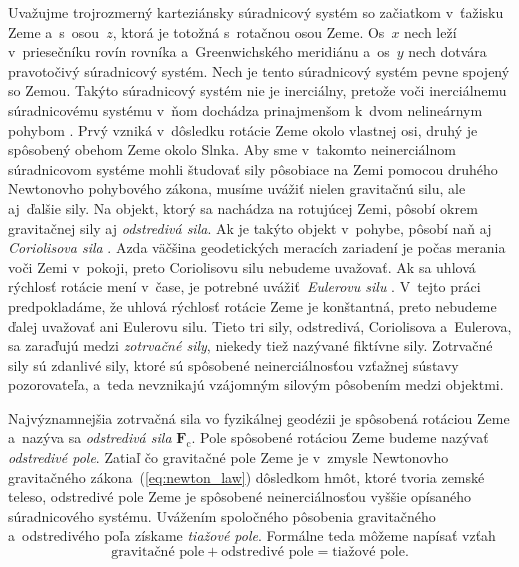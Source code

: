 \documentclass[a4paper, 12pt]{book}
\newcommand{\cidx}{\mathrm c}
\let\vec\mathbf
\begin{document}
Uvažujme trojrozmerný karteziánsky súradnicový systém so začiatkom v~ťažisku 
Zeme a~s~osou~$z$, ktorá je totožná s~rotačnou osou Zeme.  Os~$x$ nech leží 
v~priesečníku rovín rovníka a~Greenwichského meridiánu a~os~$y$ nech dotvára 
pravotočivý súradnicový systém.  Nech je tento súradnicový systém pevne spojený 
so Zemou.  Takýto súradnicový systém nie je inerciálny, pretože voči 
inerciálnemu súradnicovému systému v~ňom dochádza prinajmenšom k~dvom 
nelineárnym pohybom \parencite{SansoGeoidDetermination}.  Prvý vzniká 
v~dôsledku rotácie Zeme okolo vlastnej osi, druhý je spôsobený obehom Zeme 
okolo Slnka.  Aby sme v~takomto neinerciálnom súradnicovom systéme mohli 
študovať sily pôsobiace na Zemi pomocou druhého Newtonovho pohybového zákona, 
musíme uvážiť nielen gravitačnú silu, ale aj~ďalšie sily.  Na objekt, ktorý sa 
nachádza na rotujúcej Zemi, pôsobí okrem gravitačnej sily aj \emph{odstredivá 
sila}.  Ak je takýto objekt v~pohybe, pôsobí naň aj \emph{Coriolisova sila} 
\parencite{Torge1989,Jekeli2000,MoritzPhysicalGeodesy,SansoGeoidDetermination}.  
Azda väčšina geodetických meracích zariadení je počas merania voči Zemi 
v~pokoji, preto Coriolisovu silu nebudeme uvažovať.  Ak sa uhlová rýchlosť 
rotácie mení v~čase, je potrebné uvážiť~\emph{Eulerovu silu} 
\parencite{Torge1989,SansoGeoidDetermination}.  V~tejto práci predpokladáme, že 
uhlová rýchlosť rotácie Zeme je konštantná, preto nebudeme ďalej uvažovať ani 
Eulerovu silu.  Tieto tri sily, odstredivá, Coriolisova a~Eulerova, sa zaraďujú 
medzi \emph{zotrvačné sily}, niekedy tiež nazývané fiktívne sily.  Zotrvačné 
sily sú zdanlivé sily, ktoré sú spôsobené neinerciálnosťou vzťažnej sústavy 
pozorovateľa, a~teda nevznikajú vzájomným silovým pôsobením medzi objektmi.

Najvýznamnejšia zotrvačná sila vo fyzikálnej geodézii je spôsobená rotáciou 
Zeme a~nazýva sa \emph{odstredivá sila}
$\vec F_\cidx$.  Pole spôsobené rotáciou Zeme budeme nazývať \emph{odstredivé 
pole}.  Zatiaľ čo gravitačné pole Zeme je v~zmysle Newtonovho gravitačného 
zákona~(\ref{eq:newton_law}) dôsledkom hmôt, ktoré tvoria zemské teleso, 
odstredivé pole Zeme je spôsobené neinerciálnosťou vyššie opísaného 
súradnicového systému.  Uvážením spoločného pôsobenia gravitačného 
a~odstredivého poľa získame \emph{tiažové pole}.  Formálne teda môžeme napísať 
vzťah
%
\begin{equation*}
\textrm{gravitačné pole} + \textrm{odstredivé pole} = \textrm{tiažové pole}{.}
\end{equation*}
\end{document}
